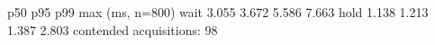            p50      p95      p99      max   (ms, n=800)
wait     3.055    3.672    5.586    7.663
hold     1.138    1.213    1.387    2.803
contended acquisitions: 98\PGZpc{}
